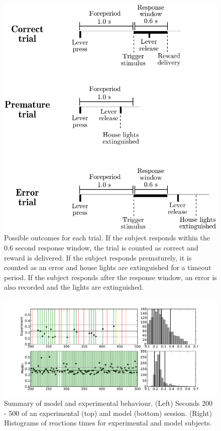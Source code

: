 \documentclass[12pt]{article}
\begin{document}
\clearpage

\begin{figure}
  \centering
    \includegraphics[width=\columnwidth]{f4-behaviour}
    \caption{Possible outcomes for each trial. If the subject
      responds within the 0.6 second response window, the trial
      is counted as correct and reward is delivered. If the
      subject responds prematurely, it is counted as an error
      and house lights are extinguished for a timeout period.
      If the subject responds after the response window,
      an error is also recorded and the lights are extinguished.}
\end{figure}

\clearpage

\begin{figure}
  \centering
    \includegraphics[width=\columnwidth]{f5-behaviour}
    \caption{Summary of model and experimental behaviour.
      (Left) Seconds 200 - 500 of an experimental (top)
      and model (bottom) session.
      (Right) Histograms of reactions times for
      experimental and model subjects.}
\end{figure}
\end{document}
